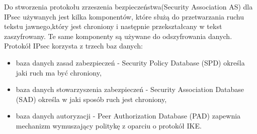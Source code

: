 \documentclass[12p]{article}
\begin{document}
Do stworzenia protokołu zrzeszenia bezpieczeństwa(Security Association AS) dla IPsec używanych jest kilka komponentów, które służą do przetwarzania ruchu tekstu jawnego,który jest chroniony i następnie przekształcany w tekst zaszyfrowany. Te same komponenty są używane do odszyfrowania danych. Protokół IPsec korzysta z trzech baz danych: 
\begin{itemize}
\item baza danych zasad zabezpieczeń - Security Policy Database (SPD) określa jaki ruch ma być chroniony,
\item baza danych stowarzyszenia zabezpieczeń - Security Association Database (SAD) określa w jaki sposób ruch jest chroniony,
\item baza danych autoryzacji - Peer Authorization Database (PAD) zapewnia mechanizm wymuszający  politykę z oparciu o protokół IKE.
\end{itemize}
\end{document}
